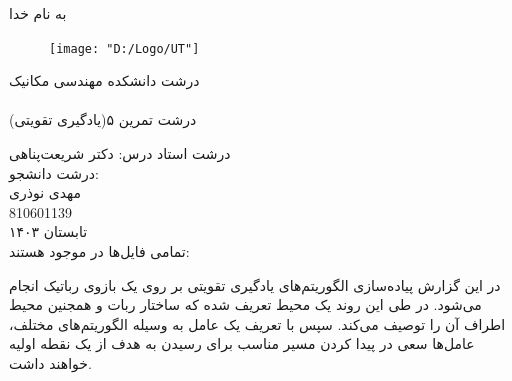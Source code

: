 \documentclass[11pt]{article}
\begin{document}
	به نام خدا\\
	\vspace{1cm}
	\begin{figure}[h]
		\begin{center}
			\texttt{[image: "D:/Logo/UT"]}
		\end{center}
	\end{figure}
	{‌درشت دانشکده مهندسی مکانیک}\\
	\vspace{1cm}
	{ }\\
	
	\vspace{0.5cm}
	{‌درشت تمرین ۵(یادگیری تقویتی)}
	\vspace{1.5cm}
	
	\vspace{1.5cm}
	{‌درشت { استاد درس:} دکتر شریعت‌پناهی}\\
	\vspace{2cm}
	{‌درشت { دانشجو:}}\\
	{ مهدی نوذری\\
	810601139}\\
	\vspace{3cm}
	تابستان ۱۴۰۳\\
	\pagebreak
		تمامی فایل‌ها در  موجود هستند:
	\href{https://github.com/Morphit/UT_AI_1403}{}
	
	\vspace{1cm}
	در این گزارش پیاده‌سازی الگوریتم‌های یادگیری تقویتی بر روی یک بازوی رباتیک انجام می‌شود. در طی این روند یک محیط تعریف شده که ساختار ربات و همجنین محیط اطراف آن را توصیف می‌کند. سپس با تعریف یک عامل به وسیله الگوریتم‌های مختلف، عامل‌ها سعی در پیدا کردن مسیر مناسب برای رسیدن به هدف از یک نقطه اولیه خواهند داشت.
\end{document}
